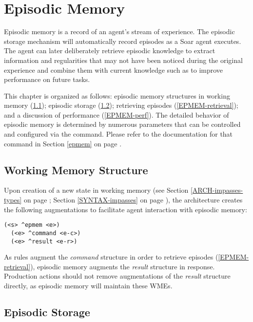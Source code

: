 \chapter{Episodic Memory}
\label{EPMEM}

Episodic memory is a record of an agent's stream of experience. 
The episodic storage mechanism will automatically record episodes as a Soar agent executes. 
The agent can later deliberately retrieve episodic knowledge to extract information and regularities that may not have been noticed during the original experience and combine them with current knowledge such as to improve performance on future tasks.

This chapter is organized as follows: episodic memory structures in working memory (\ref{EPMEM-wm}); episodic storage (\ref{EPMEM-storage}); retrieving episodes (\ref{EPMEM-retrieval}); and a discussion of performance (\ref{EPMEM-perf}). 
The detailed behavior of episodic memory is determined by numerous parameters that can be controlled and configured via the  command. 
Please refer to the documentation for that command in Section \ref{epmem} on page \pageref{epmem}.

\section{Working Memory Structure}
\label{EPMEM-wm}

Upon creation of a new state in working memory (see Section \ref{ARCH-impasses-types} on page \pageref{ARCH-impasses-types}; Section \ref{SYNTAX-impasses} on page \pageref{SYNTAX-impasses}), the architecture creates the following augmentations to facilitate agent interaction with episodic memory:

\begin{verbatim}
(<s> ^epmem <e>)
  (<e> ^command <e-c>)
  (<e> ^result <e-r>)
\end{verbatim}

As rules augment the \emph{command} structure in order to retrieve episodes (\ref{EPMEM-retrieval}), episodic memory augments the \emph{result} structure in response.
Production actions should not remove augmentations of the \emph{result} structure directly, as episodic memory will maintain these WMEs.


\section{Episodic Storage}
\label{EPMEM-storage}

